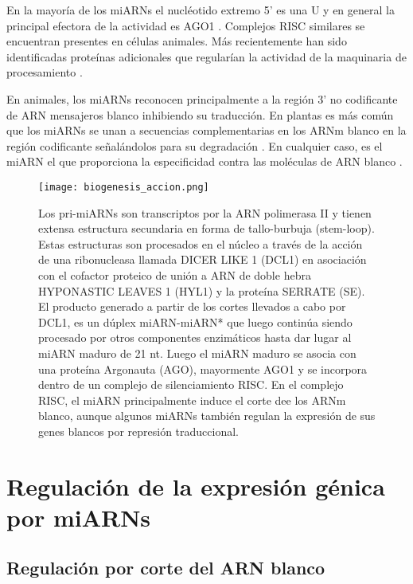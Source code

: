 En la mayoría de los miARNs el nucléotido extremo 5' es una U y en general la principal efectora de la actividad es AGO1 \citep{Voinnet2009669,pmid18342361,Vazquez2004a}.
Complejos RISC similares se encuentran presentes en células animales.
Más recientemente han sido identificadas proteínas adicionales que regularían la actividad de la maquinaria de procesamiento \citep{Bologna11112012}.

En animales, los miARNs reconocen principalmente a la región 3' no codificante de ARN mensajeros blanco inhibiendo su traducción.
En plantas es más común que los miARNs se unan a secuencias complementarias en los ARNm blanco en la región codificante señalándolos para su degradación \citep{Jones-Rhoades2006}.
En cualquier caso, es el miARN el que proporciona la especificidad contra las moléculas de ARN blanco \citep{Bartel2004}.


\begin{figure}[htbp!] 
    \centering    
    \texttt{[image: biogenesis\_accion.png]}
    \caption[Biogénesis y actividad de los miARNs en plantas]{
    Los pri-miARNs son transcriptos por la ARN polimerasa II y tienen extensa estructura secundaria en forma de tallo-burbuja (stem-loop).
    Estas estructuras son procesados en el núcleo a través de la acción de una ribonucleasa llamada DICER LIKE 1 (DCL1) en asociación con el cofactor proteico de unión a ARN de doble hebra HYPONASTIC LEAVES 1 (HYL1) y la proteína SERRATE (SE).
    El producto generado a partir de los cortes llevados a cabo por DCL1, es un dúplex miARN-miARN* que luego continúa siendo procesado por otros componentes enzimáticos hasta dar lugar al miARN maduro de 21 nt.
    Luego el miARN maduro se asocia con una proteína Argonauta (AGO), mayormente AGO1 y se incorpora dentro de un complejo de silenciamiento RISC.
    En el complejo RISC, el miARN principalmente induce el corte dee los ARNm blanco, aunque algunos miARNs también regulan la expresión de sus genes blancos por represión traduccional.
    }
    \label{fig:biogenesis_accion}
\end{figure}

\section{Regulación de la expresión génica por miARNs}

\subsection{Regulación por corte del ARN blanco}

